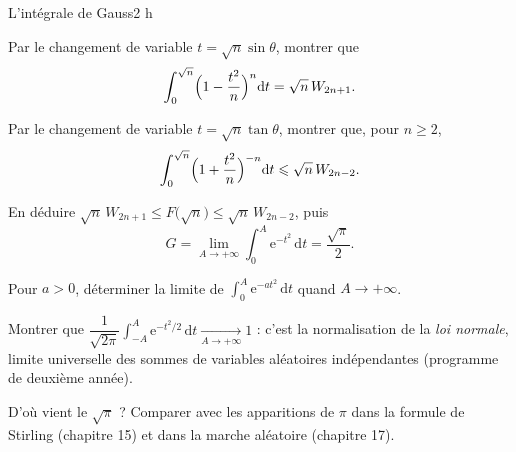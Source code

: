 \begin{defi}{L'intégrale de Gauss}{2 h}
\begin{questions}[resume]
  \item Par le changement de variable $t=\sqrt n\sin\theta$, montrer que
    \[
    \int_0^{\sqrt n}\Bigl(1-\frac{t^{2}}{n}\Bigr)^{n}\mathrm{d}t
    =\sqrt n\,W_{2n+1} .
    \]
  \item Par le changement de variable $t=\sqrt n\tan\theta$, montrer que,
    pour $n\geqslant2$,
    \[
    \int_0^{\sqrt n}\Bigl(1+\frac{t^{2}}{n}\Bigr)^{-n}\mathrm{d}t
    \leqslant\sqrt n\,W_{2n-2} .
    \]
  \item En déduire $\sqrt n\,W_{2n+1}\leqslant F\bigl(\sqrt n\bigr)\leqslant\sqrt n\,W_{2n-2}$,
    puis
    \[
    G=\lim_{A\to+\infty}\int_0^{A}\mathrm{e}^{-t^{2}}\,\mathrm{d}t=\frac{\sqrt\pi}{2} .
    \]
\end{questions}

\begin{questions}[resume]
  \item Pour $a>0$, déterminer la limite de
    $\displaystyle\int_0^{A}\mathrm{e}^{-at^{2}}\,\mathrm{d}t$ quand
    $A\to+\infty$.
  \item Montrer que
    $\dfrac{1}{\sqrt{2\pi}}\displaystyle\int_{-A}^{A}\mathrm{e}^{-t^{2}/2}\,\mathrm{d}t
    \xrightarrow[A\to+\infty]{}1$ : c'est la normalisation de la \emph{loi
    normale}, limite universelle des sommes de variables aléatoires
    indépendantes (programme de deuxième année).
  \item D'où vient le $\sqrt\pi$ ? Comparer avec les apparitions de $\pi$
    dans la formule de Stirling (chapitre 15) et dans la marche aléatoire
    (chapitre 17).
\end{questions}
\end{defi}
